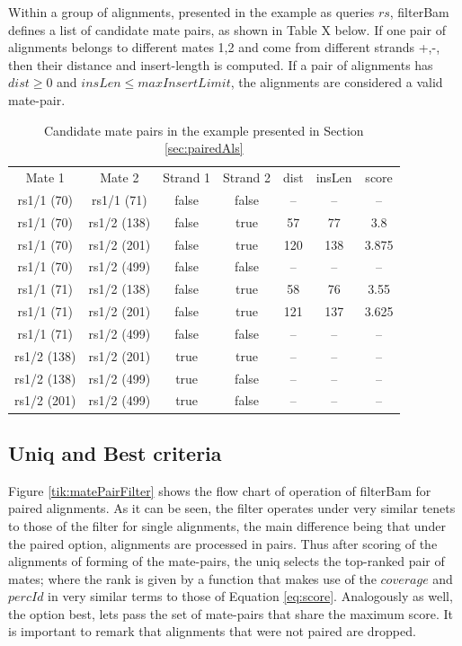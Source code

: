 \documentclass[11pt]{article}
\newcommand{\option}[1]{{\fontfamily{phv}\selectfont#1}}
\begin{document}
{Within a group of alignments, presented in the example as queries $rs$, filterBam defines a list of candidate 
mate pairs, as shown in Table X below. If one pair of alignments belongs to different mates {1,2} and come 
from different strands {+,-}, then their distance and insert-length is computed. If a pair of alignments 
has $dist\ge 0 $ and $insLen\le maxInsertLimit$, the alignments are considered a valid mate-pair.

\begin{table}
\begin{center}
\begin{tabular}{|c|c|c|c|c|c|c|}\hline
	Mate 1 & Mate 2 & Strand 1 & Strand 2 & dist & insLen & score \\ \cline{1-7}
	rs1/1 (70) & rs1/1 (71) & false & false & -- & -- & -- \\ \cline{1-7}
	rs1/1 (70) & rs1/2 (138) & false & true & 57 & 77 & 3.8 \\ \cline{1-7}
	rs1/1 (70) & rs1/2 (201) & false & true & 120 & 138 & 3.875 \\ \cline{1-7}
	rs1/1 (70) & rs1/2 (499) & false & false & -- & -- & -- \\ \cline{1-7}
	rs1/1 (71) & rs1/2 (138) & false & true & 58 & 76 & 3.55 \\ \cline{1-7}
	rs1/1 (71) & rs1/2 (201) & false & true & 121 & 137 & 3.625 \\ \cline{1-7}
	rs1/1 (71) & rs1/2 (499) & false & false & -- & -- & -- \\ \cline{1-7}
	rs1/2 (138) & rs1/2 (201) & true & true & -- & -- & -- \\ \cline{1-7}
	rs1/2 (138) & rs1/2 (499) & true & false & -- & -- & -- \\ \cline{1-7}
	rs1/2 (201) & rs1/2 (499) & true & false & -- & -- & -- \\ \cline{1-7}
\end{tabular}
\label{tab:}
\caption{Candidate mate pairs in the example presented in Section \ref{sec:pairedAls}}
\end{center}
\end{table}    

\subsection{Uniq and Best criteria}

Figure \ref{tik:matePairFilter} shows the flow chart of operation of filterBam for paired alignments. 
As it can be seen, the filter operates under very similar tenets to those of the filter for single 
alignments, the main difference being that under the \option{paired} option, alignments are processed in 
pairs. Thus after scoring of the alignments of forming of the mate-pairs, the \option{uniq} selects the 
top-ranked pair of mates; where the rank is given by a function that makes use of the $coverage$ and 
$percId$ in very similar terms to those of Equation \ref{eq:score}. Analogously as well, the option 
\option{best}, lets pass the set of mate-pairs that share the maximum score. It is important to remark 
that alignments that were not paired are dropped. 


}
\end{document}
